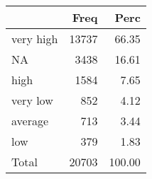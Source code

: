 
\begin{tabular}[t]{lrr}
\toprule
  & Freq & Perc\\
\midrule
very high & 13737 & 66.35\\
NA & 3438 & 16.61\\
high & 1584 & 7.65\\
very low & 852 & 4.12\\
average & 713 & 3.44\\
\addlinespace
low & 379 & 1.83\\
Total & 20703 & 100.00\\
\bottomrule
\end{tabular}